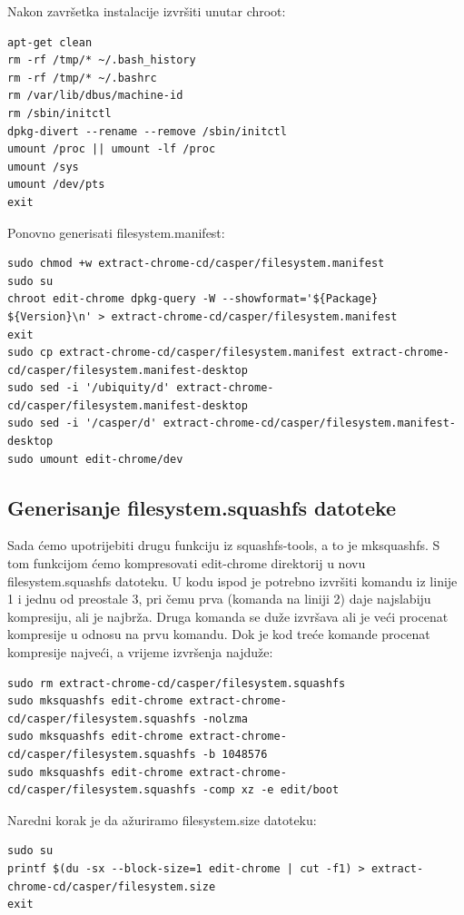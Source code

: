 \documentclass[12pt,vi]{mitthesis}
\begin{document}
\noindent
Nakon završetka instalacije izvršiti unutar chroot:
\begin{lstlisting}[style=BashInputStyle]
apt-get clean
rm -rf /tmp/* ~/.bash_history
rm -rf /tmp/* ~/.bashrc
rm /var/lib/dbus/machine-id
rm /sbin/initctl
dpkg-divert --rename --remove /sbin/initctl
umount /proc || umount -lf /proc
umount /sys
umount /dev/pts
exit
\end{lstlisting}

\noindent
Ponovno generisati filesystem.manifest:
\begin{lstlisting}[style=BashInputStyle]
sudo chmod +w extract-chrome-cd/casper/filesystem.manifest
sudo su
chroot edit-chrome dpkg-query -W --showformat='${Package} ${Version}\n' > extract-chrome-cd/casper/filesystem.manifest
exit
sudo cp extract-chrome-cd/casper/filesystem.manifest extract-chrome-cd/casper/filesystem.manifest-desktop
sudo sed -i '/ubiquity/d' extract-chrome-cd/casper/filesystem.manifest-desktop
sudo sed -i '/casper/d' extract-chrome-cd/casper/filesystem.manifest-desktop
sudo umount edit-chrome/dev
\end{lstlisting}

\subsection*{Generisanje filesystem.squashfs datoteke}
\noindent
Sada ćemo upotrijebiti drugu funkciju iz squashfs-tools, a to je mksquashfs. S tom funkcijom ćemo kompresovati edit-chrome direktorij u novu filesystem.squashfs datoteku. U kodu ispod je potrebno izvršiti komandu iz linije 1 i jednu od preostale 3, pri čemu prva (komanda na liniji 2) daje najslabiju kompresiju, ali je najbrža. Druga komanda se duže izvršava ali je veći procenat kompresije u odnosu na prvu komandu. Dok je kod treće komande procenat kompresije najveći, a vrijeme izvršenja najduže:
\begin{lstlisting}[style=BashInputStyle]
sudo rm extract-chrome-cd/casper/filesystem.squashfs
sudo mksquashfs edit-chrome extract-chrome-cd/casper/filesystem.squashfs -nolzma 
sudo mksquashfs edit-chrome extract-chrome-cd/casper/filesystem.squashfs -b 1048576
sudo mksquashfs edit-chrome extract-chrome-cd/casper/filesystem.squashfs -comp xz -e edit/boot
\end{lstlisting}

\noindent
Naredni korak je da ažuriramo filesystem.size datoteku:
\begin{lstlisting}[style=BashInputStyle]
sudo su
printf $(du -sx --block-size=1 edit-chrome | cut -f1) > extract-chrome-cd/casper/filesystem.size
exit
\end{lstlisting}
\end{document}
